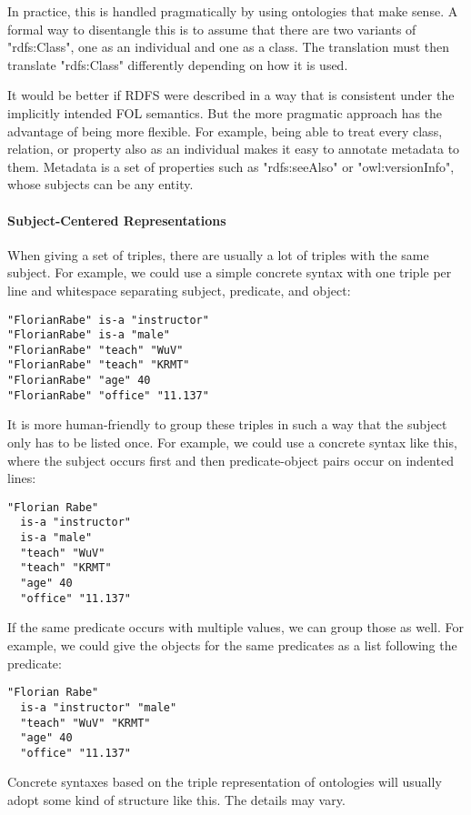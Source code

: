 In practice, this is handled pragmatically by using ontologies that make sense.
A formal way to disentangle this is to assume that there are two variants of "rdfs:Class", one as an individual and one as a class.
The translation must then translate "rdfs:Class" differently depending on how it is used.

It would be better if RDFS were described in a way that is consistent under the implicitly intended FOL semantics.
But the more pragmatic approach has the advantage of being more flexible.
For example, being able to treat every class, relation, or property also as an individual makes it easy to annotate metadata to them.
Metadata is a set of properties such as "rdfs:seeAlso" or "owl:versionInfo", whose subjects can be any entity.


\paragraph{Subject-Centered Representations}
When giving a set of triples, there are usually a lot of triples with the same subject.
For example, we could use a simple concrete syntax with one triple per line and whitespace separating subject, predicate, and object:
\begin{lstlisting}
"FlorianRabe" is-a "instructor"
"FlorianRabe" is-a "male"
"FlorianRabe" "teach" "WuV"
"FlorianRabe" "teach" "KRMT"
"FlorianRabe" "age" 40
"FlorianRabe" "office" "11.137"
\end{lstlisting}

It is more human-friendly to group these triples in such a way that the subject only has to be listed once.
For example, we could use a concrete syntax like this, where the subject occurs first and then predicate-object pairs occur on indented lines:
\begin{lstlisting}
"Florian Rabe"
  is-a "instructor"
  is-a "male"
  "teach" "WuV"
  "teach" "KRMT"
  "age" 40
  "office" "11.137"
\end{lstlisting}

If the same predicate occurs with multiple values, we can group those as well.
For example, we could give the objects for the same predicates as a list following the predicate:
\begin{lstlisting}
"Florian Rabe"
  is-a "instructor" "male"
  "teach" "WuV" "KRMT"
  "age" 40
  "office" "11.137"
\end{lstlisting}

Concrete syntaxes based on the triple representation of ontologies will usually adopt some kind of structure like this.
The details may vary.
